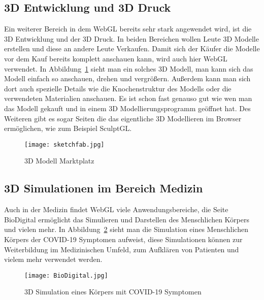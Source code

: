 \subsection{3D Entwicklung und 3D Druck}
Ein weiterer Bereich in dem WebGL bereits sehr stark angewendet wird, ist die 3D Entwicklung und der 3D Druck. In beiden Bereichen wollen Leute 3D Modelle erstellen und diese an andere Leute Verkaufen.
Damit sich der Käufer die Modelle vor dem Kauf bereits komplett anschauen kann, wird auch hier WebGL verwendet. \cite{manuninja}
In Abbildung~\ref{fig:sketchfab} sieht man ein solches 3D Modell, man kann sich das Modell einfach so anschauen, drehen und vergrößern. Außerdem kann man sich dort auch spezielle Details wie die Knochenstruktur des Modells oder
die verwendeten Materialien anschauen. Es ist schon fast genauso gut wie wen man das Modell gekauft und in einem 3D Modellierungsprogramm geöffnet hat. Des Weiteren gibt es sogar Seiten die das eigentliche 3D Modellieren im Browser ermöglichen, wie zum Beispiel SculptGL. \cite{sculptgl}
\begin{figure}
    \centering
    \texttt{[image: sketchfab.jpg]}
    \caption{3D Modell Marktplatz \cite{sketchfab}} \label{fig:sketchfab}
    \end{figure}

\subsection{3D Simulationen im Bereich Medizin}
Auch in der Medizin findet WebGL viele Anwendungsbereiche, die Seite BioDigital ermöglicht das Simulieren und Darstellen des Menschlichen Körpers und vielen mehr.
In Abbildung~\ref{fig:BioDigital} sieht man die Simulation eines Menschlichen Körpers der COVID-19 Symptomen aufweist, diese Simulationen können zur Weiterbildung im Medizinischen Umfeld, zum Aufklären von Patienten und vielem mehr verwendet werden.\cite{BioDigital}
\begin{figure}
    \centering
    \texttt{[image: BioDigital.jpg]}
    \caption{3D Simulation eines Körpers mit COVID-19 Symptomen \cite{BioDigital}} \label{fig:BioDigital}
    \end{figure}